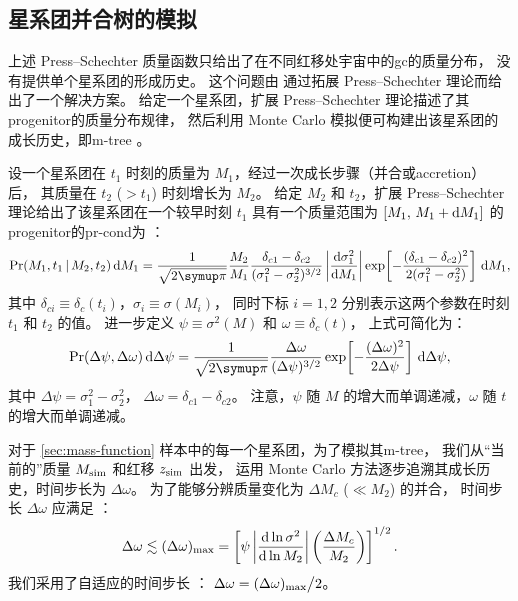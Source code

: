 \subsection{星系团并合树的模拟}
\label{sec:merging-history}

上述 Press--Schechter 质量函数只给出了在不同红移处宇宙中的\ac{gc}的质量分布，
没有提供单个星系团的形成历史。
这个问题由  通过拓展 Press--Schechter 理论而给出了一个解决方案。
给定一个星系团，扩展 Press--Schechter 理论描述了其\ac{progenitor}的质量分布规律，
然后利用 Monte Carlo 模拟便可构建出该星系团的成长历史，即\acf{m-tree}
\cite{lacey1993,randall2002}。

设一个星系团在 $t_1$ 时刻的质量为 $M_1$，经过一次成长步骤（并合或\ac{accretion}）后，
其质量在 $t_2$ ($> t_1$) 时刻增长为 $M_2$。
给定 $M_2$ 和 $t_2$，扩展 Press--Schechter 理论给出了该星系团在一个较早时刻 $t_1$
具有一个质量范围为 $[M_1,\, M_1+\mathrm{d}M_1]$ 的\ac{progenitor}的\ac{pr-cond}为
\cite{lacey1993,randall2002}：
\begin{equation}
  \label{eq:eps-condprob}
  \R{Pr}(M_1, t_1 \,|\, M_2, t_2) \,\D{M_1} =
    \frac{1}{\sqrt{2\Cpi}} \frac{M_2}{M_1}
    \frac{\delta_{c1} - \delta_{c2}}{(\sigma_1^2 - \sigma_2^2)^{3/2}}
    \left| \diff{\sigma_1^2}{M_1} \right|
    \exp \!\left[ -\frac{(\delta_{c1} - \delta_{c2})^2}
      {2(\sigma_1^2 - \sigma_2^2)} \right] \,\D{M_1} ,
\end{equation}
其中
$\delta_{ci} \equiv \delta_c(t_i)$，$\sigma_i \equiv \sigma(M_i)$，
同时下标 $i = 1, 2$ 分别表示这两个参数在时刻 $t_1$ 和 $t_2$ 的值。
进一步定义 $\psi \equiv \sigma^2(M)$ 和 $\omega \equiv \delta_c(t)$，
上式可简化为：
\begin{equation}
  \label{eq:eps-condprob2}
  \R{Pr}(\Delta\psi, \Delta\omega) \,\D{\Delta\psi} =
    \frac{1}{\sqrt{2\Cpi}} \frac{\Delta\omega}{(\Delta\psi)^{3/2}}
    \exp \!\left[ -\frac{(\Delta\omega)^2}{2 \Delta\psi} \right]
    \,\D{\Delta\psi} ,
\end{equation}
其中
$\Delta\psi = \sigma_1^2 - \sigma_2^2$，
$\Delta\omega = \delta_{c1} - \delta_{c2}$。
注意，$\psi$ 随 $M$ 的增大而单调递减，$\omega$ 随 $t$ 的增大而单调递减。

对于 \autoref{sec:mass-function} 样本中的每一个星系团，为了模拟其\ac{m-tree}，
我们从\enquote{当前的}质量 $M_{\mathrm{sim}}$ 和红移 $z_{\mathrm{sim}}$ 出发，
运用 Monte Carlo 方法逐步追溯其成长历史，时间步长为 $\Delta\omega$。
为了能够分辨质量变化为 $\Delta M_c$ ($\ll M_2$) 的并合，
时间步长 $\Delta\omega$ 应满足 \cite{lacey1993}：
\begin{equation}
  \Delta\omega \lesssim (\Delta\omega)_{\mathrm{max}} =
    \left[ \psi \left| \frac{\mathrm{d}\ln \sigma^2}{\mathrm{d}\ln M_2} \right|
      \left( \frac{\Delta M_c}{M_2} \right) \right]^{1/2} .
\end{equation}
我们采用了自适应的时间步长 \cite{randall2002}：
$\Delta\omega = (\Delta\omega)_{\mathrm{max}} \big/ 2$。

